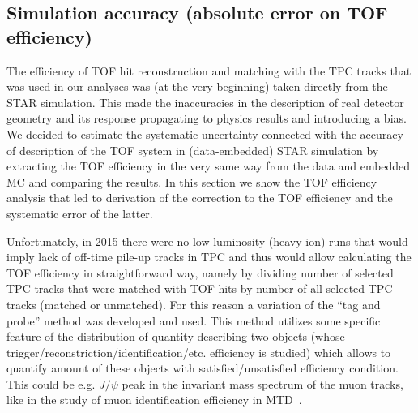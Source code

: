 \subsection{Simulation accuracy (absolute error on TOF efficiency)}\label{subsec:tofAbsEffSystAndCorr}

The efficiency of TOF hit reconstruction and matching with the TPC tracks that was used in our analyses was (at the very beginning) taken directly from the STAR simulation. This made the inaccuracies in the description of real detector geometry and its response propagating to physics results and introducing a bias. We decided to estimate the systematic uncertainty connected with the accuracy of description of the TOF system in (data-embedded) STAR simulation by extracting the TOF efficiency in the very same way from the data and embedded MC and comparing the results. In this section we show the TOF efficiency analysis that led to derivation of the correction to the TOF efficiency and the systematic error of the latter.

Unfortunately, in 2015 there were no low-luminosity (heavy-ion) runs that would imply lack of off-time pile-up tracks in TPC and thus would allow calculating the TOF efficiency in straightforward way, namely by dividing number of selected TPC tracks that were matched with TOF hits by number of all selected TPC tracks (matched or unmatched). For this reason a variation of the ``tag and probe'' method was developed and used. This method utilizes some specific feature of the distribution of quantity describing two objects (whose trigger/reconstriction/identification/etc. efficiency is studied) which allows to quantify amount of these objects with satisfied/unsatisfied efficiency condition. This could be e.g. $J/\psi$ peak in the invariant mass spectrum of the muon tracks, like in the study of muon identification efficiency in MTD~\cite{Huang:2016dbm}. %


